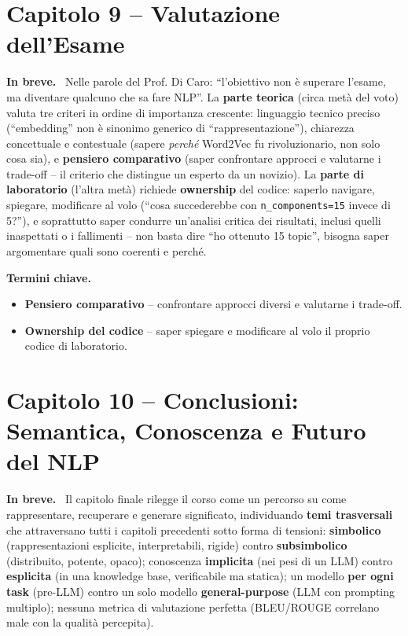 \documentclass[11pt,a4paper]{article}
\newcommand{\spiega}{\medskip\noindent\textbf{\textcolor{blue!45!black}{In breve.}}\ }
\newcommand{\termini}{\medskip\noindent\textbf{\textcolor{blue!45!black}{Termini chiave.}}}
\begin{document}
\section*{Capitolo 9 -- Valutazione dell'Esame}

\spiega
Nelle parole del Prof. Di Caro: ``l'obiettivo non \`e superare l'esame, ma diventare qualcuno che sa fare NLP''. La \textbf{parte teorica} (circa met\`a del voto) valuta tre criteri in ordine di importanza crescente: linguaggio tecnico preciso (``embedding'' non \`e sinonimo generico di ``rappresentazione''), chiarezza concettuale e contestuale (sapere \emph{perch\'e} Word2Vec fu rivoluzionario, non solo cosa sia), e \textbf{pensiero comparativo} (saper confrontare approcci e valutarne i trade-off -- il criterio che distingue un esperto da un novizio). La \textbf{parte di laboratorio} (l'altra met\`a) richiede \textbf{ownership} del codice: saperlo navigare, spiegare, modificare al volo (``cosa succederebbe con \texttt{n\_components=15} invece di 5?''), e soprattutto saper condurre un'analisi critica dei risultati, inclusi quelli inaspettati o i fallimenti -- non basta dire ``ho ottenuto 15 topic'', bisogna saper argomentare quali sono coerenti e perch\'e.

\termini
\begin{itemize}
\item \textbf{Pensiero comparativo} -- confrontare approcci diversi e valutarne i trade-off.
\item \textbf{Ownership del codice} -- saper spiegare e modificare al volo il proprio codice di laboratorio.
\end{itemize}

\section*{Capitolo 10 -- Conclusioni: Semantica, Conoscenza e Futuro del NLP}

\spiega
Il capitolo finale rilegge il corso come un percorso su come rappresentare, recuperare e generare significato, individuando \textbf{temi trasversali} che attraversano tutti i capitoli precedenti sotto forma di tensioni: \textbf{simbolico} (rappresentazioni esplicite, interpretabili, rigide) contro \textbf{subsimbolico} (distribuito, potente, opaco); conoscenza \textbf{implicita} (nei pesi di un LLM) contro \textbf{esplicita} (in una knowledge base, verificabile ma statica); un modello \textbf{per ogni task} (pre-LLM) contro un solo modello \textbf{general-purpose} (LLM con prompting multiplo); nessuna metrica di valutazione perfetta (BLEU/ROUGE correlano male con la qualit\`a percepita).
\end{document}
